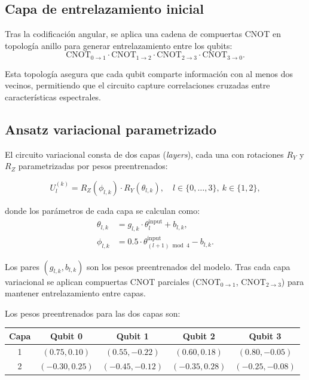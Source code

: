 \documentclass[11pt,a4paper,spanish]{book}
\begin{document}
\subsection{Capa de entrelazamiento inicial}

Tras la codificaci\'{o}n angular, se aplica una cadena de compuertas CNOT en topolog\'{i}a anillo para generar entrelazamiento entre los qubits:
\begin{equation}
\mathrm{CNOT}_{0\to1} \cdot \mathrm{CNOT}_{1\to2} \cdot \mathrm{CNOT}_{2\to3} \cdot \mathrm{CNOT}_{3\to0}.
\label{eq:entanglement-ring}
\end{equation}

Esta topolog\'{i}a asegura que cada qubit comparte informaci\'{o}n con al menos dos vecinos, permitiendo que el circuito capture correlaciones cruzadas entre caracter\'{i}sticas espectrales.

\subsection{Ansatz variacional parametrizado}

El circuito variacional consta de dos capas (\textit{layers}), cada una con rotaciones $R_Y$ y $R_Z$ parametrizadas por pesos preentrenados:

\begin{equation}
U_l^{(k)} = R_Z(\phi_{l,k}) \cdot R_Y(\theta_{l,k}), \quad l \in \{0,\ldots,3\},\ k \in \{1,2\},
\label{eq:ansatz-layer}
\end{equation}

donde los par\'{a}metros de cada capa se calculan como:
\begin{align}
\theta_{l,k} &= g_{l,k} \cdot \theta_l^{\mathrm{input}} + b_{l,k}, \label{eq:theta-param} \\
\phi_{l,k} &= 0.5 \cdot \theta_{(l+1)\bmod 4}^{\mathrm{input}} - b_{l,k}. \label{eq:phi-param}
\end{align}

Los pares $(g_{l,k}, b_{l,k})$ son los pesos preentrenados del modelo. Tras cada capa variacional se aplican compuertas CNOT parciales ($\mathrm{CNOT}_{0\to1}$, $\mathrm{CNOT}_{2\to3}$) para mantener entrelazamiento entre capas.

Los pesos preentrenados para las dos capas son:
\begin{center}
\begin{tabular}{c c c c c}
\hline\hline
Capa & Qubit 0 & Qubit 1 & Qubit 2 & Qubit 3 \\ [0.5ex]
\hline
1 & $(0.75, 0.10)$ & $(0.55, -0.22)$ & $(0.60, 0.18)$ & $(0.80, -0.05)$ \\
2 & $(-0.30, 0.25)$ & $(-0.45, -0.12)$ & $(-0.35, 0.28)$ & $(-0.25, -0.08)$ \\
\hline
\end{tabular}
\end{center}
\end{document}
